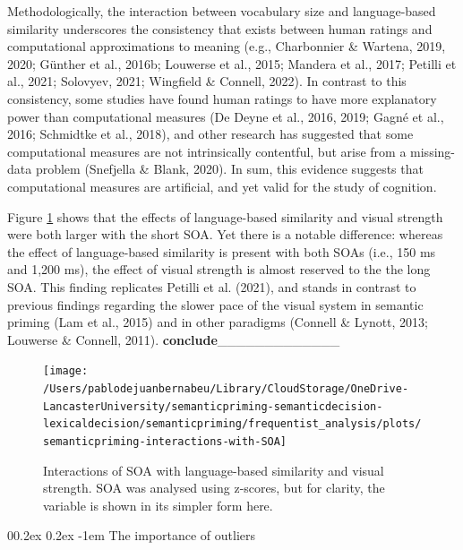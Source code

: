 \documentclass[
  12pt,
  man,floatsintext]{apa7}
\makeatletter
\let\oldparagraph\paragraph
\renewcommand{\paragraph}[1]{\oldparagraph{#1}\mbox{}}
\renewcommand{\paragraph}{\@startsection{paragraph}{4}{\parindent}%
  {0\baselineskip \@plus 0.2ex \@minus 0.2ex}%
  {-1em}%
  {\normalfont\normalsize\bfseries\itshape\typesectitle}}
\makeatother
\begin{document}
Methodologically, the interaction between vocabulary size and language-based similarity underscores the consistency that exists between human ratings and computational approximations to meaning (e.g., Charbonnier \& Wartena, 2019, 2020; Günther et al., 2016b; Louwerse et al., 2015; Mandera et al., 2017; Petilli et al., 2021; Solovyev, 2021; Wingfield \& Connell, 2022). In contrast to this consistency, some studies have found human ratings to have more explanatory power than computational measures (De Deyne et al., 2016, 2019; Gagné et al., 2016; Schmidtke et al., 2018), and other research has suggested that some computational measures are not intrinsically contentful, but arise from a missing-data problem (Snefjella \& Blank, 2020). In sum, this evidence suggests that computational measures are artificial, and yet valid for the study of cognition.

Figure \ref{fig:semanticpriming-interactions-with-SOA} shows that the effects of language-based similarity and visual strength were both larger with the short SOA. Yet there is a notable difference: whereas the effect of language-based similarity is present with both SOAs (i.e., 150 ms and 1,200 ms), the effect of visual strength is almost reserved to the the long SOA. This finding replicates Petilli et al. (2021), and stands in contrast to previous findings regarding the slower pace of the visual system in semantic priming (Lam et al., 2015) and in other paradigms (Connell \& Lynott, 2013; Louwerse \& Connell, 2011). \textbf{conclude}\_\_\_\_\_\_\_\_\_\_\_\_\_

\begin{figure}

{\centering \texttt{[image: /Users/pablodejuanbernabeu/Library/CloudStorage/OneDrive-LancasterUniversity/semanticpriming-semanticdecision-lexicaldecision/semanticpriming/frequentist\_analysis/plots/semanticpriming-interactions-with-SOA]} 

}

\caption{Interactions of SOA with language-based similarity and visual strength. SOA was analysed using z-scores, but for clarity, the variable is shown in its simpler form here.}\label{fig:semanticpriming-interactions-with-SOA}
\end{figure}

\hypertarget{the-importance-of-outliers}{%
\paragraph{The importance of outliers}\label{the-importance-of-outliers}}
\end{document}
